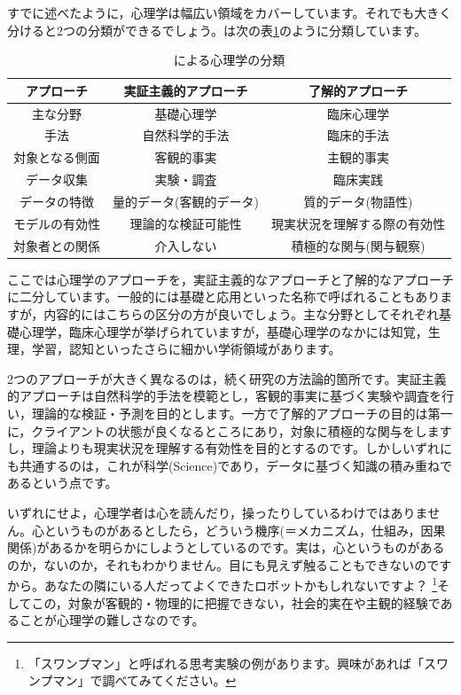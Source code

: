 \documentclass{ltjsbook}
\begin{document}
すでに述べたように，心理学は幅広い領域をカバーしています。それでも大きく分けると2つの分類ができるでしょう。\textcite{Shimoyama2001}は次の表\ref{tbl01_01}のように分類しています。

\begin{table}[hb]
	\centering
	\caption{\textcite{Shimoyama2001}による心理学の分類}
	\begin{tabular}{ccc}
		アプローチ   & 実証主義的アプローチ    & 了解的アプローチ       \\\hline
		主な分野    & 基礎心理学         & 臨床心理学          \\
		手法      & 自然科学的手法       & 臨床的手法          \\
		対象となる側面 & 客観的事実         & 主観的事実          \\
		データ収集   & 実験・調査         & 臨床実践           \\
		データの特徴  & 量的データ(客観的データ) & 質的データ(物語性)     \\
		モデルの有効性 & 理論的な検証可能性     & 現実状況を理解する際の有効性 \\
		対象者との関係 & 介入しない         & 積極的な関与(関与観察)   \\\hline
	\end{tabular}
	\label{tbl01_01}
\end{table}
ここでは心理学のアプローチを，実証主義的なアプローチと了解的なアプローチに二分しています。一般的には基礎と応用といった名称で呼ばれることもありますが，内容的にはこちらの区分の方が良いでしょう。主な分野としてそれぞれ基礎心理学，臨床心理学が挙げられていますが，基礎心理学のなかには知覚，生理，学習，認知といったさらに細かい学術領域があります。

2つのアプローチが大きく異なるのは，続く研究の方法論的箇所です。実証主義的アプローチは自然科学的手法を模範とし，客観的事実に基づく実験や調査を行い，理論的な検証・予測を目的とします。一方で了解的アプローチの目的は第一に，クライアントの状態が良くなるところにあり，対象に積極的な関与をしますし，理論よりも現実状況を理解する有効性を目的とするのです。しかしいずれにも共通するのは，これが科学(Science)であり，データに基づく知識の積み重ねであるという点です。

いずれにせよ，心理学者は心を読んだり，操ったりしているわけではありません。心というものがあるとしたら，どういう機序(＝メカニズム，仕組み，因果関係)があるかを明らかにしようとしているのです。実は，心というものがあるのか，ないのか，それもわかりません。目にも見えず触ることもできないのですから。あなたの隣にいる人だってよくできたロボットかもしれないですよ？ \footnote{「スワンプマン」と呼ばれる思考実験の例があります。興味があれば「スワンプマン」で調べてみてください。}そしてこの，対象が客観的・物理的に把握できない，社会的実在や主観的経験であることが心理学の難しさなのです。
\end{document}
